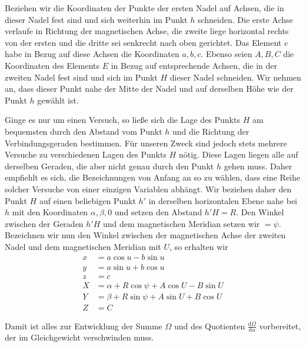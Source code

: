 Beziehen wir die Koordinaten der Punkte der ersten Nadel auf Achsen, die in dieser Nadel fest sind und sich weiterhin im Punkt $h$ schneiden. Die erste Achse verlaufe in Richtung der magnetischen Achse, die zweite liege horizontal rechts von der ersten und die dritte sei senkrecht nach oben gerichtet. Das Element $e$ habe in Bezug auf diese Achsen die Koordinaten $a,b,c$. Ebenso seien $A,B,C$ die Koordinaten des Elements $E$ in Bezug auf entsprechende Achsen, die in der zweiten Nadel fest sind und sich im Punkt $H$ dieser Nadel schneiden. Wir nehmen an, dass dieser Punkt nahe der Mitte der Nadel und auf derselben Höhe wie der Punkt $h$ gewählt ist.

Ginge es nur um einen Versuch, so ließe sich die Lage des Punkts $H$ am bequemsten durch den Abstand vom Punkt $h$ und die Richtung der Verbindungsgeraden bestimmen. Für unseren Zweck sind jedoch stets mehrere Versuche zu verschiedenen Lagen des Punkts $H$ nötig. Diese Lagen liegen alle auf derselben Geraden, die aber nicht genau durch den Punkt $h$ gehen muss. Daher empfiehlt es sich, die Bezeichnungen von Anfang an so zu wählen, dass eine Reihe solcher Versuche von einer einzigen Variablen abhängt. Wir beziehen daher den Punkt $H$ auf einen beliebigen Punkt $h'$ in derselben horizontalen Ebene nahe bei $h$ mit den Koordinaten $\alpha,\beta,0$ und setzen den Abstand $h'H=R$. Den Winkel zwischen der Geraden $h'H$ und dem magnetischen Meridian setzen wir $=\psi$. Bezeichnen wir nun den Winkel zwischen der magnetischen Achse der zweiten Nadel und dem magnetischen Meridian mit $U$, so erhalten wir
\[
\begin{aligned}
x&=a\cos u-b\sin u\\
y&=a\sin u+b\cos u\\
z&=c\\
X&=\alpha+R\cos\psi+A\cos U-B\sin U\\
Y&=\beta+R\sin\psi+A\sin U+B\cos U\\
Z&=C
\end{aligned}
\]

Damit ist alles zur Entwicklung der Summe $\Omega$ und des Quotienten $\frac{\mathrm{d}\Omega}{\mathrm{d}u}$ vorbereitet, der im Gleichgewicht verschwinden muss.

